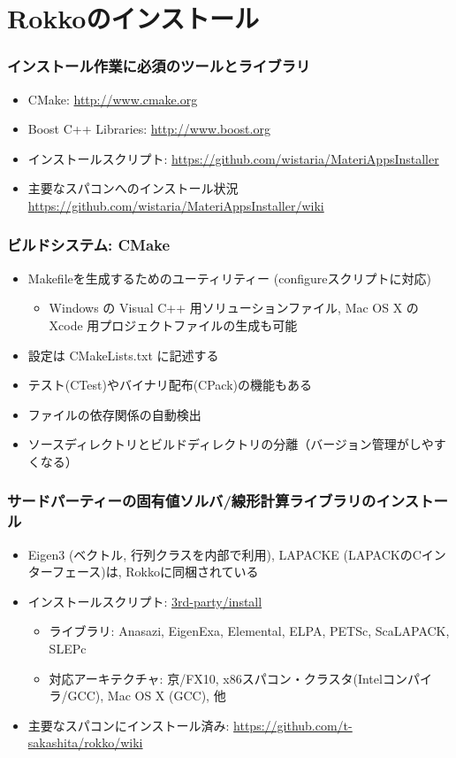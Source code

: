 \section{Rokkoのインストール}

\begin{frame}
  \frametitle{インストール作業に必須のツールとライブラリ}
  \begin{itemize}
    \setlength{\itemsep}{1em}
  \item CMake: \url{http://www.cmake.org}
  \item Boost C++ Libraries: \url{http://www.boost.org}
  \item インストールスクリプト: \url{https://github.com/wistaria/MateriAppsInstaller}
  \item 主要なスパコンへのインストール状況 \\
    \url{https://github.com/wistaria/MateriAppsInstaller/wiki}
  \end{itemize}
\end{frame}

\begin{frame}
  \frametitle{ビルドシステム: CMake}
  \begin{itemize}
    \setlength{\itemsep}{1em}
  \item Makefileを生成するためのユーティリティー (configureスクリプトに対応)
    \begin{itemize}
    \item Windows の Visual C++ 用ソリューションファイル, Mac OS X の Xcode 用プロジェクトファイルの生成も可能
    \end{itemize}
  \item 設定は CMakeLists.txt に記述する
  \item テスト(CTest)やバイナリ配布(CPack)の機能もある
  \item ファイルの依存関係の自動検出
  \item ソースディレクトリとビルドディレクトリの分離（バージョン管理がしやすくなる）
  \end{itemize}
\end{frame}

\begin{frame}
  \frametitle{サードパーティーの固有値ソルバ/線形計算ライブラリのインストール}
  \begin{itemize}
    \setlength{\itemsep}{1em}
  \item Eigen3 (ベクトル, 行列クラスを内部で利用), LAPACKE (LAPACKのCインターフェース)は, Rokkoに同梱されている
  \item インストールスクリプト: \href{https://github.com/t-sakashita/rokko/tree/master/3rd-party/install}{3rd-party/install}
    \begin{itemize}
      \item ライブラリ: Anasazi, EigenExa, Elemental, ELPA, PETSc, ScaLAPACK, SLEPc
      \item 対応アーキテクチャ: 京/FX10, x86スパコン・クラスタ(Intelコンパイラ/GCC), Mac OS X (GCC), 他
    \end{itemize}
  \item 主要なスパコンにインストール済み: \url{https://github.com/t-sakashita/rokko/wiki}
  \end{itemize}
\end{frame}

